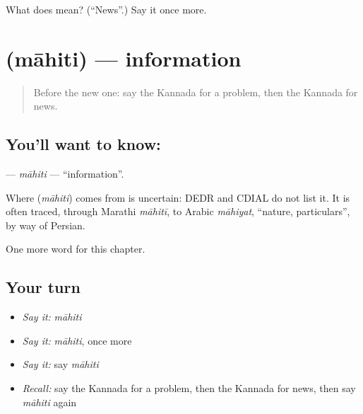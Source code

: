 \begin{tcolorbox}[breakable,colback=teal!4,colframe=teal!35!black,title={Before you move on}]
What does  mean? (\textquotedblleft{}News\textquotedblright{}.) Say it once more.
\end{tcolorbox}
\section[\texorpdfstring{\kn{ಮಾಹಿತಿ} (māhiti)}{ಮಾಹಿತಿ (māhiti)}]{ (māhiti) — information}

\label{lesson:KA-C269-mahiti}



\begin{quote}
Before the new one: say the Kannada for a problem, then the Kannada for news.
\end{quote}

\subsection*{You'll want to know: }
\textbf{} — \emph{māhiti} — \textquotedblleft{}information\textquotedblright{}.

\begin{cousinweb}
Where \textbf{} (\emph{māhiti}) comes from is uncertain: DEDR and CDIAL do not list it. It is often traced, through Marathi \emph{māhitī}, to Arabic \emph{māhiyat}, \textquotedblleft{}nature, particulars\textquotedblright{}, by way of Persian.
\end{cousinweb}

\begin{grammarlens}[title={What you've built}]
One more word for this chapter.
\end{grammarlens}

\subsection*{Your turn}
\begin{itemize}
\raggedright
  \item \emph{Say it:} \emph{māhiti}
  \item \emph{Say it:} \emph{māhiti}, once more
  \item \emph{Say it:} say \emph{māhiti}
  \item \emph{Recall:} say the Kannada for a problem, then the Kannada for news, then say \emph{māhiti} again
\end{itemize}

